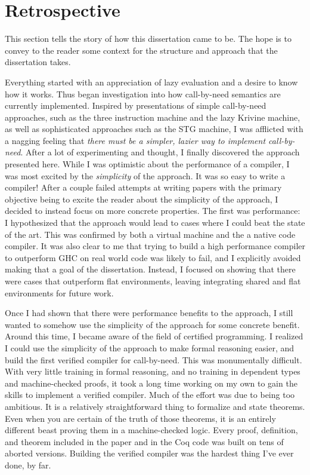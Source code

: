 \section{Retrospective}

This section tells the story of how this dissertation came to be. The hope is to
convey to the reader some context for the structure and approach that the
dissertation takes. 

Everything started with an appreciation of lazy evaluation and a desire to know
how it works. Thus began investigation into how call-by-need semantics are
currently implemented. Inspired by presentations of simple call-by-need
approaches, such as the three instruction machine and the lazy Krivine machine,
as well as sophisticated approaches such as the STG machine, I was afflicted
with a nagging feeling that \emph{there must be a simpler, lazier way to
implement call-by-need}. After a lot of experimenting and thought, I finally
discovered the approach presented here. While I was optimistic about the
performance of a compiler, I was most excited by the \emph{simplicity} of the
approach. It was so easy to write a compiler! After a couple failed attempts at
writing papers with the primary objective being to excite the reader about
the simplicity of the approach, I decided to instead focus on more concrete
properties. The first was performance: I hypothesized that the approach would
lead to cases where I could beat the state of the art. This was confirmed by
both a virtual machine and the a native code compiler. It was also clear to me
that trying to build a high performance compiler to outperform GHC on real world
code was likely to fail, and I explicitly avoided making that a goal of the
dissertation. Instead, I focused on showing that there were cases that
outperform flat environments, leaving integrating shared and flat environments
for future work.

Once I had shown that there were performance benefits to the approach, I still
wanted to somehow use the simplicity of the approach for some concrete benefit.
Around this time, I became aware of the field of certified programming. I
realized I could use the simplicity of the approach to make formal reasoning
easier, and build the first verified compiler for call-by-need. This was
monumentally difficult. With very little training in formal reasoning, and no
training in dependent types and machine-checked proofs, it took a long time
working on my own to gain the skills to implement a verified compiler. Much of
the effort was due to being too ambitious. It is a relatively straightforward
thing to formalize and state theorems. Even when you are certain of the truth of
those theorems, it is an entirely different beast proving them in a
machine-checked logic. Every proof, definition, and theorem included in the
paper and in the Coq code was built on tens of aborted versions. Building the
verified compiler was the hardest thing I've ever done, by far.

